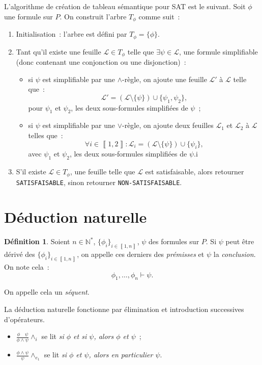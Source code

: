 \documentclass{article}
\theoremstyle{definition}
\newtheorem{déf}[thm]{Définition}
\theoremstyle{remark}
\newcommand{\intint}[2]{\left\llbracket#1, #2\right\rrbracket}
\newcommand{\N}{\mathbb N}
\begin{document}
	L'algorithme de création de tableau sémantique pour SAT est le suivant. Soit $\phi$ une formule sur $P$. On construit l'arbre $T_\phi$ comme suit~:
	\begin{enumerate}
		\item Initialisation~: l'arbre est défini par $T_\phi = \{\phi\}$.
		\item Tant qu'il existe une feuille $\mathcal L \in T_\phi$ telle que $\exists \psi \in \mathcal L$, une formule simplifiable (donc contenant une
		conjonction ou une disjonction)~:
		\begin{itemize}
			\item si $\psi$ est simplifiable par une $\land$-règle, on ajoute une feuille $\mathcal L'$ à $\mathcal L$ telle que~:
			\[\mathcal L' = \left(\mathcal L \setminus \{\psi\}\right) \cup \{\psi_1, \psi_2\},\]
			pour $\psi_1$ et $\psi_2$, les deux sous-formules simplifiées de $\psi$~;
			\item si $\psi$ est simplifiable par une $\lor$-règle, on ajoute deux feuilles $\mathcal L_1$ et $\mathcal L_2$ à $\mathcal L$
			telles que~:
			\[\forall i \in \intint 12 : \mathcal L_i = \left(\mathcal L \setminus \{\psi\}\right) \cup \{\psi_i\},\]
			avec $\psi_1$ et $\psi_2$, les deux sous-formules simplifiées de $\psi$.i
		\end{itemize}
		\item S'il existe $\mathcal L \in T_\phi$, une feuille telle que $\mathcal L$ est satisfaisable, alors retourner \texttt{SATISFAISABLE}, sinon retourner
		\texttt{NON-SATISFAISABLE}.
	\end{enumerate}

\section{Déduction naturelle}
	\begin{déf} Soient $n \in \N^*$, $\{\phi_i\}_{i \in \intint 1n}$, $\psi$ des formules sur $P$. Si $\psi$ peut être dérivé des $\{\phi_i\}_{i \in \intint 1n}$,
	on appelle ces derniers des \textit{prémisses} et $\psi$ la \textit{conclusion}. On note cela~:
	\[\phi_1, \ldots, \phi_n \vdash \psi.\]

	On appelle cela un \textit{séquent}.
	\end{déf}

	La déduction naturelle fonctionne par élimination et introduction successives d'opérateurs.

	\begin{itemize}
		\item $\frac {\phi \quad \psi}{\phi \land \psi}\land_i$ se lit \textit{si $\phi$ et si $\psi$, alors $\phi$ et $\psi$}~;
		\item $\frac {\phi \land \psi}{\psi}\land_{e_1}$ se lit \textit{si $\phi$ et $\psi$, alors en particulier $\psi$}.
	\end{itemize}
\end{document}
